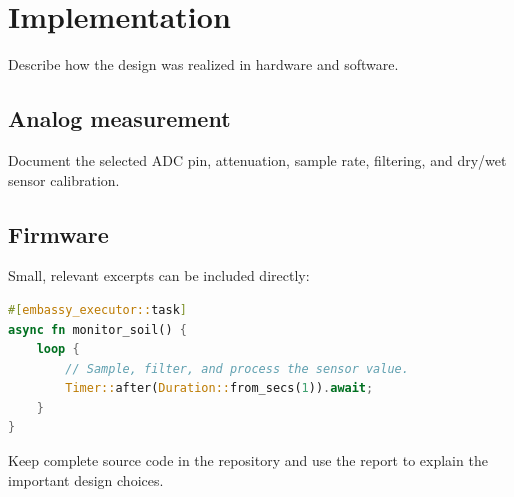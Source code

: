 \chapter{Implementation}
\label{chap:implementation}

Describe how the design was realized in hardware and software.

\section{Analog measurement}

Document the selected ADC pin, attenuation, sample rate, filtering, and dry/wet
sensor calibration.

\section{Firmware}

Small, relevant excerpts can be included directly:

\begin{lstlisting}[language=Rust,caption={Example Embassy task structure.},label={lst:embassy-task}]
#[embassy_executor::task]
async fn monitor_soil() {
    loop {
        // Sample, filter, and process the sensor value.
        Timer::after(Duration::from_secs(1)).await;
    }
}
\end{lstlisting}

Keep complete source code in the repository and use the report to explain the
important design choices.
